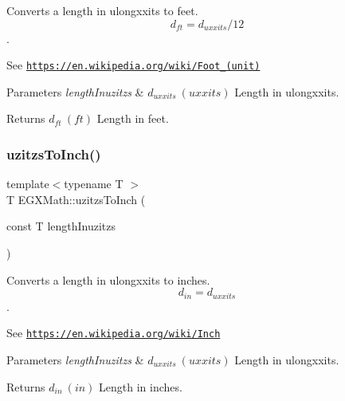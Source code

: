 Converts a length in ulongxxits to feet. \[ d_{ft}=d_{uxxits} / 12 \]. 

See \href{https://en.wikipedia.org/wiki/Foot_(unit)}{\tt https\+://en.\+wikipedia.\+org/wiki/\+Foot\+\_\+(unit)} 
\begin{DoxyParams}{Parameters}
{\em length\+Inuzitzs} & $ d_{uxxits}\ (uxxits)$ Length in ulongxxits. \\
\hline
\end{DoxyParams}
\begin{DoxyReturn}{Returns}
$ d_{ft}\ (ft)$ Length in feet. 
\end{DoxyReturn}
\mbox{\label{group___e_g_x_math-_conversions-_length_conversions-uzitzs-_imperial_gad471f5c0b894eb0f2850a19347306ed4}} 
\subsubsection{\texorpdfstring{uzitzs\+To\+Inch()}{uzitzsToInch()}}
{\footnotesize\ttfamily template$<$typename T $>$ \\
T E\+G\+X\+Math\+::uzitzs\+To\+Inch (\begin{DoxyParamCaption}\item[{const T}]{length\+Inuzitzs }\end{DoxyParamCaption})}



Converts a length in ulongxxits to inches. \[ d_{in}=d_{uxxits} \]. 

See \href{https://en.wikipedia.org/wiki/Inch}{\tt https\+://en.\+wikipedia.\+org/wiki/\+Inch} 
\begin{DoxyParams}{Parameters}
{\em length\+Inuzitzs} & $ d_{uxxits}\ (uxxits)$ Length in ulongxxits. \\
\hline
\end{DoxyParams}
\begin{DoxyReturn}{Returns}
$ d_{in}\ (in)$ Length in inches. 
\end{DoxyReturn}
\mbox{\label{group___e_g_x_math-_conversions-_length_conversions-uzitzs-_imperial_ga53d4abecb2e7ac39c15c4ef89b9447a9}} 
